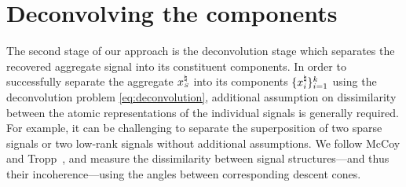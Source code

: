 \section{Deconvolving the components}\label{sec:3-3}

The second stage of our approach is the deconvolution stage which separates the recovered aggregate signal into its constituent components. In order to successfully separate the aggregate $x_{\scriptscriptstyle S}^{\natural}$ into its components $\{x_i^{\natural}\}_{i=1}^k$ using the deconvolution problem \eqref{eq:deconvolution}, additional assumption on dissimilarity between the atomic representations of the individual signals is generally required. For example, it can be challenging to separate the superposition of two sparse signals or two low-rank signals without additional assumptions. We follow McCoy and Tropp~\cite{mccoy2013achievable}, and measure the dissimilarity between signal structures---and thus their incoherence---using the angles between corresponding descent cones.

